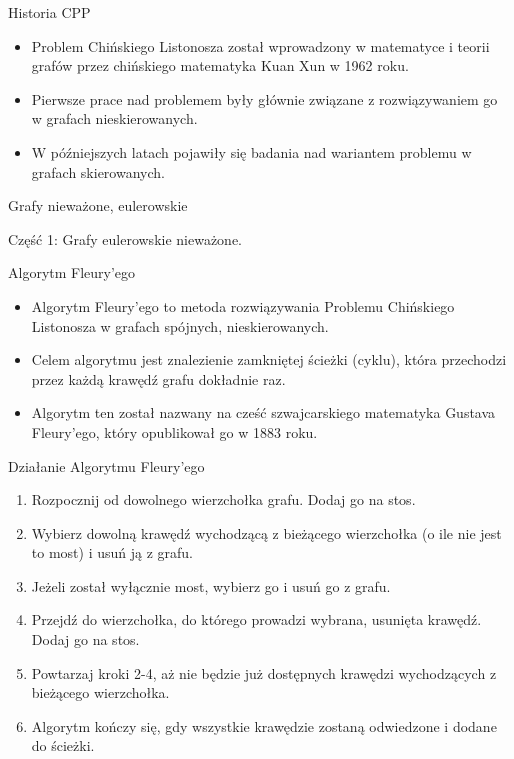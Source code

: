 \documentclass[polish,envcountsect,10pt]{beamer}
\begin{document}
\begin{frame}{Historia CPP}
    \begin{itemize}
        \item Problem Chińskiego Listonosza został wprowadzony w matematyce i teorii grafów przez chińskiego matematyka Kuan Xun w 1962 roku.
        \item Pierwsze prace nad problemem były głównie związane z rozwiązywaniem go w grafach nieskierowanych.
        \item W późniejszych latach pojawiły się badania nad wariantem problemu w grafach skierowanych.
    \end{itemize}
\end{frame}

\begin{frame}{Grafy nieważone, eulerowskie}
    \begin{block}{}
        \begin{center}
            Część 1: Grafy eulerowskie nieważone.
        \end{center}
    \end{block}
\end{frame}

\begin{frame}{Algorytm Fleury'ego}
    \begin{itemize}
      \item Algorytm Fleury'ego to metoda rozwiązywania Problemu Chińskiego Listonosza w grafach spójnych, nieskierowanych.
      \item Celem algorytmu jest znalezienie zamkniętej ścieżki (cyklu), która przechodzi przez każdą krawędź grafu dokładnie raz.
      \item Algorytm ten został nazwany na cześć szwajcarskiego matematyka Gustava Fleury'ego, który opublikował go w 1883 roku.
    \end{itemize}
\end{frame}

\begin{frame}{Działanie Algorytmu Fleury'ego}
    \begin{enumerate}
        \item Rozpocznij od dowolnego wierzchołka grafu. Dodaj go na stos.
        \item Wybierz dowolną krawędź wychodzącą z bieżącego wierzchołka (o ile nie jest to most)  i usuń ją z grafu.
        \item Jeżeli został wyłącznie most, wybierz go i usuń go z grafu.
        \item Przejdź do wierzchołka, do którego prowadzi wybrana, usunięta krawędź. Dodaj go na stos.
        \item Powtarzaj kroki 2-4, aż nie będzie już dostępnych krawędzi wychodzących z bieżącego wierzchołka.
        \item Algorytm kończy się, gdy wszystkie krawędzie zostaną odwiedzone i dodane do ścieżki.
    \end{enumerate}
\end{frame}
\end{document}
